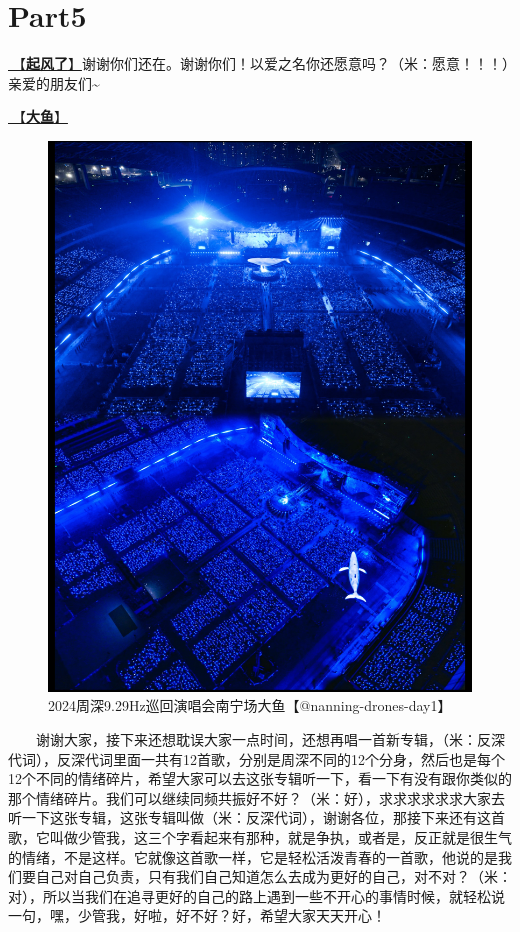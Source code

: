 \documentclass[]{ctexbook}
\begin{document}
\section{Part5}\label{nanning-20241206-part5}

\hyperref[the-wind-rises]{🎵【\textbf{起风了}】}谢谢你们还在。谢谢你们！以爱之名你还愿意吗？（米：愿意！！！）亲爱的朋友们\textasciitilde{}

\hyperref[big-fish]{🎵【\textbf{大鱼}】}

\begin{figure}

{\centering \includegraphics[width=400pt]{img/nanning20241206/004} 

}

\caption{2024周深9.29Hz巡回演唱会南宁场大鱼【@nanning-drones-day1】}\label{fig:unnamed-chunk-157}
\end{figure}

  谢谢大家，接下来还想耽误大家一点时间，还想再唱一首新专辑，（米：反深代词），反深代词里面一共有12首歌，分别是周深不同的12个分身，然后也是每个12个不同的情绪碎片，希望大家可以去这张专辑听一下，看一下有没有跟你类似的那个情绪碎片。我们可以继续同频共振好不好？（米：好），求求求求求求大家去听一下这张专辑，这张专辑叫做（米：反深代词），谢谢各位，那接下来还有这首歌，它叫做少管我，这三个字看起来有那种，就是争执，或者是，反正就是很生气的情绪，不是这样。它就像这首歌一样，它是轻松活泼青春的一首歌，他说的是我们要自己对自己负责，只有我们自己知道怎么去成为更好的自己，对不对？（米：对），所以当我们在追寻更好的自己的路上遇到一些不开心的事情时候，就轻松说一句，嘿，少管我，好啦，好不好？好，希望大家天天开心！
\end{document}
